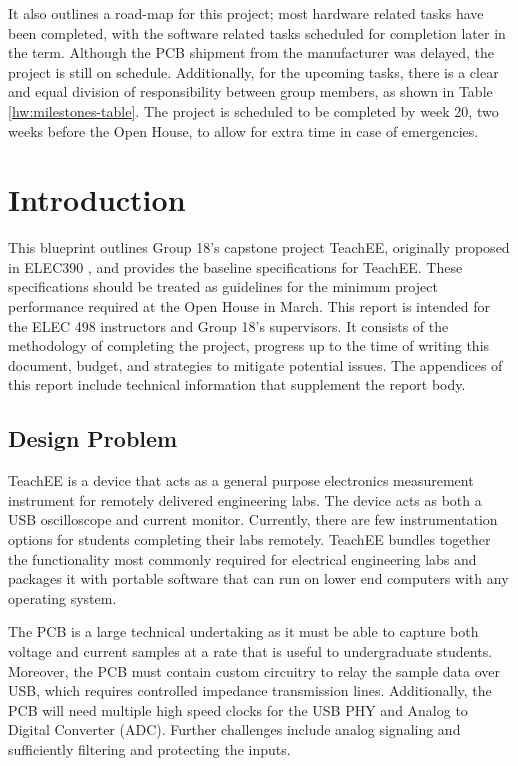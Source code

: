 \documentclass[letterpaper,12pt]{article}
\begin{document}
It also outlines a road-map for this project; most hardware related tasks have
been completed, with the software related tasks scheduled for completion later
in the term. Although the PCB shipment from the manufacturer was delayed, the
project is still on schedule. Additionally, for the upcoming tasks, there is a
clear and equal division of responsibility between group members, as shown in
Table \ref{hw:milestones-table}. The project is scheduled to be completed by
week 20, two weeks before the Open House, to allow for extra time in case of
emergencies.

\tableofcontents
\listoffigures
\listoftables
\newpage
{}
\section{Introduction} \label{sec:intro} %
This blueprint outlines Group 18's capstone project TeachEE,
originally proposed in ELEC390 \cite{prop_390}, and provides the baseline
specifications for TeachEE. These specifications should be treated as guidelines
for the minimum project performance required at the Open House in March. This
report is intended for the ELEC 498 instructors and Group 18's supervisors. It
consists of the methodology of completing the project, progress up to
the time of writing this document, budget, and strategies to mitigate potential
issues. The appendices of this report include technical information that
supplement the report body.

\subsection{Design Problem}
TeachEE is a device that acts as a general purpose electronics measurement
instrument for remotely delivered engineering labs. The device acts as both a
USB oscilloscope and current monitor. Currently, there are few instrumentation
options for students completing their labs remotely. TeachEE bundles
together the functionality most commonly required for electrical engineering
labs and packages it with portable software that can run on lower end computers
with any operating system.

The PCB is a large technical undertaking as it must be able to capture both
voltage and current samples at a rate that is useful to undergraduate students.
Moreover, the PCB must contain custom circuitry to relay the sample data over
USB, which requires controlled impedance transmission
lines. Additionally, the PCB will need multiple high speed clocks for
the USB PHY and Analog to Digital Converter (ADC). Further challenges include
analog signaling and sufficiently filtering and protecting the inputs.
\end{document}
